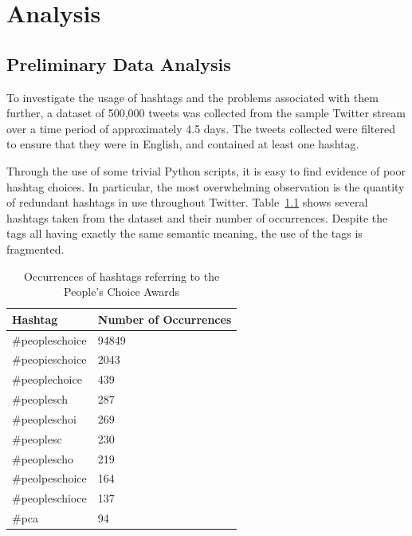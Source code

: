 \documentclass[11pt,a4paper]{report}
\begin{document}
\pagebreak

\chapter{Analysis}
\label{chap:analysis}

\section{Preliminary Data Analysis}

To investigate the usage of hashtags and the problems associated with them further, a dataset of 500,000 tweets was collected from the sample Twitter stream over a time period of approximately 4.5 days. The tweets collected were filtered to ensure that they were in English, and contained at least one hashtag.

Through the use of some trivial Python scripts, it is easy to find evidence of poor hashtag choices. In particular, the most overwhelming observation is the quantity of redundant hashtags in use throughout Twitter. Table~\ref{tbl:redundancy} shows several hashtags taken from the dataset and their number of occurrences. Despite the tags all having exactly the same semantic meaning, the use of the tags is fragmented.

\begin{table}[htpb]
\centering
\begin{tabular}{| l | l |}
    \hline
    \textbf{Hashtag} & \textbf{Number of Occurrences} \\
    \hline \hline
    \#peopleschoice & 94849 \\ \hline
    \#peopieschoice & 2043 \\ \hline
    \#peoplechoice  & 439 \\ \hline
    \#peoplesch     & 287 \\ \hline
    \#peopleschoi   & 269 \\ \hline
    \#peoplesc      & 230 \\ \hline
    \#peoplescho    & 219 \\ \hline
    \#peolpeschoice & 164 \\ \hline
    \#peopleschioce & 137 \\ \hline
    \#pca           & 94 \\ \hline
\end{tabular}
\caption{Occurrences of hashtags referring to the People's Choice Awards}
\label{tbl:redundancy}
\end{table}
\end{document}
